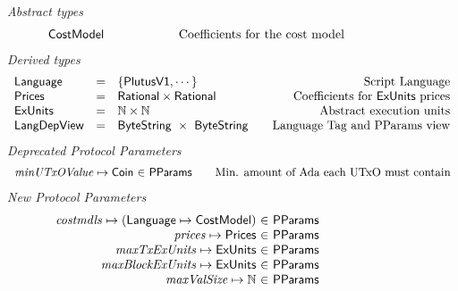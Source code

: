 \begin{figure*}[htb]
  \emph{Abstract types}
  \begin{equation*}
    \begin{array}{l@{\qquad\qquad\qquad}r}
      \CostMod & \text{Coefficients for the cost model}
    \end{array}
  \end{equation*}
  \emph{Derived types}
  \begin{equation*}
    \begin{array}{l@{\quad=\quad}l@{\qquad}r}
      \Language
      & \{\PlutusVI, \dotsb\}
      & \text{Script Language}
      \\
      \Prices
      & \mathsf{Rational} \times \mathsf{Rational}
      & \text {Coefficients for $\ExUnits$ prices}
      \\
      \ExUnits
      & \N \times \N
      & \text{Abstract execution units}
      \\
      \LangDepView
      & \ByteString~\times~\ByteString
      & \text{Language Tag and PParams view}
    \end{array}
  \end{equation*}
  \emph{Deprecated Protocol Parameters}
  \begin{equation*}
      \begin{array}{r@{~\in~}l@{\qquad}r}
        \var{minUTxOValue} \mapsto \Coin & \PParams & \text{Min. amount of Ada each UTxO must contain}
      \end{array}
  \end{equation*}
  \emph{New Protocol Parameters}
  \begin{equation*}
      \begin{array}{r@{~\in~}l@{\qquad}r}
        \var{costmdls} \mapsto (\Language \mapsto \CostMod) & \PParams \\
        \var{prices} \mapsto \Prices & \PParams \\
        \var{maxTxExUnits} \mapsto \ExUnits & \PParams \\
        \var{maxBlockExUnits} \mapsto \ExUnits & \PParams \\
        \var{maxValSize} \mapsto \N & \PParams \\

\end{array}
\end{equation*}
\end{figure*}
